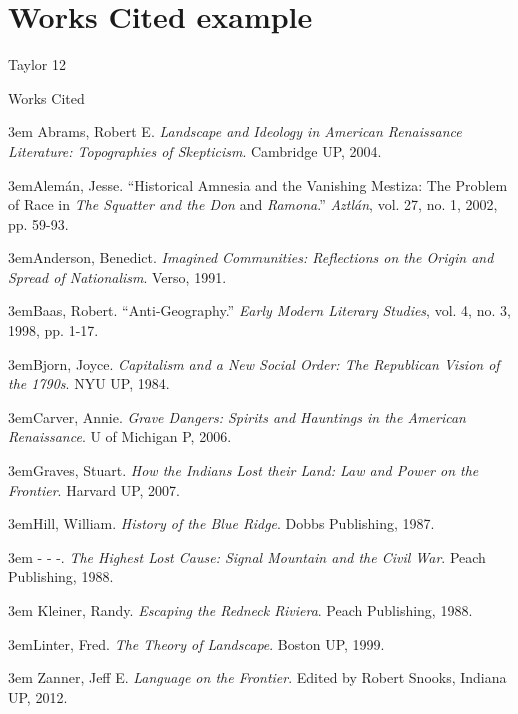 \section{Works Cited example}

\bigskip

\begin{tcolorbox}[enhanced,width=4.2in,left=.3in, right=.3in,
   drop fuzzy shadow southeast,
   halign=flush left,
    boxrule=0.4pt,sharp corners,colframe=black!80!black,colback=white!10]

\medskip

{\scriptsize \begin{flushright} Taylor 12 \end{flushright}

\begin{doublespacing}
\begin{center}Works Cited \end{center}
\hangindent3em{
Abrams, Robert E. \emph{Landscape and Ideology in American Renaissance Literature: Topographies of Skepticism}. Cambridge UP, 2004.}

\hangindent3em{Alemán, Jesse. “Historical Amnesia and the Vanishing Mestiza: The Problem of Race in \emph{The Squatter and the Don} and \emph{Ramona}.” \emph{Aztlán}, vol. 27, no. 1, 2002, pp. 59-93.}

\hangindent3em{Anderson, Benedict. \emph{Imagined Communities: Reflections on the Origin and Spread of Nationalism}. Verso, 1991.}

\hangindent3em{Baas, Robert. “Anti-Geography.” \emph{Early Modern Literary Studies}, vol. 4, no. 3, 1998, pp. 1-17.}

\hangindent3em{Bjorn, Joyce. \emph{Capitalism and a New Social Order: The Republican Vision of the 1790s}. NYU UP, 1984.}

\hangindent3em{Carver, Annie. \emph{Grave Dangers: Spirits and Hauntings in the American Renaissance}. U of Michigan P, 2006.}

\hangindent3em{Graves, Stuart. \emph{How the Indians Lost their Land: Law and Power on the Frontier}. Harvard UP, 2007.}

\hangindent3em{Hill, William. \emph{History of the Blue Ridge}. Dobbs Publishing, 1987.}

\hangindent3em{
- - -. \emph{The Highest Lost Cause: Signal Mountain and the Civil War}. Peach Publishing, 1988.
}

\hangindent3em{
Kleiner, Randy. \emph{Escaping the Redneck Riviera}. Peach Publishing, 1988.
}

\hangindent3em{Linter, Fred. \emph{The Theory of Landscape}. Boston UP, 1999.
}

\hangindent3em{
Zanner, Jeff E. \emph{Language on the Frontier}. Edited by Robert Snooks, Indiana UP, 2012.}

\end{doublespacing}}

\bigskip
\bigskip
\bigskip
\bigskip
\end{tcolorbox}


